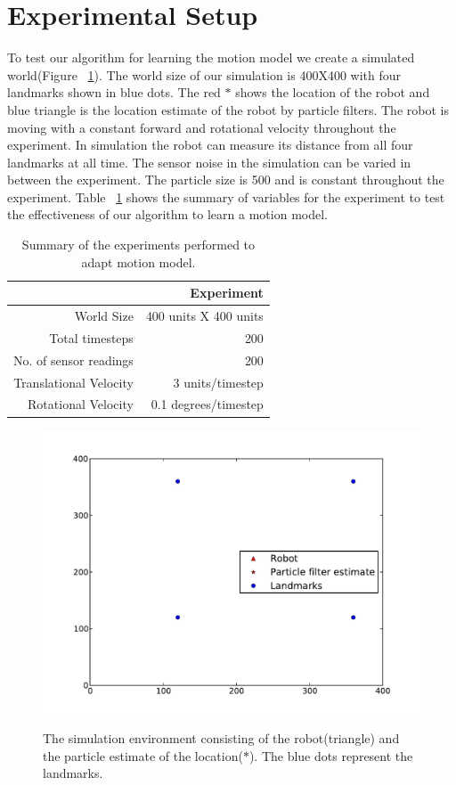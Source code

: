 \documentclass[12pt]{dalcsthesis}
\begin{document}
\section{Experimental Setup}
To test our algorithm for learning the motion model we create a simulated world(Figure ~\ref{fig-: simulation world}). The world size of our simulation is 400X400 with four landmarks shown in blue dots. The red $\ast$ shows the location of the robot and blue triangle is the location estimate of the  robot by particle filters. The robot is moving with a constant forward and rotational velocity throughout the experiment. In simulation the robot can measure its distance from all four landmarks at all time. The sensor noise in the simulation can be varied in between the experiment. The particle size is 500 and is constant throughout the experiment. Table ~\ref{tab-constant parameters} shows the summary of variables for the experiment to test the effectiveness of our algorithm to learn a motion model.
\begin{table}[tbh]
\centering
\begin{tabular}{|r|r|}
    \hline
    & Experiment \\
    \hline \hline
    World Size & 400 units X 400 units\\
    \hline
    Total timesteps & 200  \\
    \hline
    No. of sensor readings & 200 \\
    \hline
    Translational Velocity & 3 units/timestep \\
    \hline
    Rotational Velocity & 0.1 degrees/timestep \\
    \hline
\end{tabular}
 \caption{\label{tab-constant parameters}Summary of the experiments performed to adapt motion model.}
\end{table}

\begin{figure}
  \centering
     {\includegraphics[height = 3.0 in]{./plots/world.pdf}}
  \caption{\label{fig-: simulation world}The simulation environment consisting of the robot(triangle) and the particle estimate of the location($\ast$). The blue dots represent the landmarks.}
\end{figure}
\end{document}
